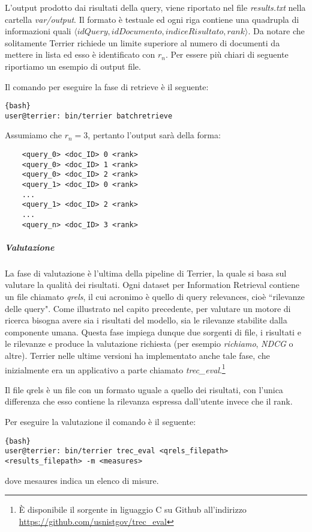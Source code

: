 L'output prodotto dai risultati della query, viene riportato
nel file \textit{results.txt} nella cartella \textit{var/output}. Il formato è testuale
ed ogni riga contiene una quadrupla di informazioni quali
$\langle idQuery, idDocumento, indiceRisultato, rank \rangle$.
Da notare che solitamente Terrier richiede un limite superiore
al numero di documenti da mettere in lista ed esso è identificato
con $r_n$. Per essere più chiari di seguente riportiamo un esempio
di output file.

Il comando per eseguire la fase di retrieve è il seguente:
\begin{lstlisting}{bash}
user@terrier: bin/terrier batchretrieve
\end{lstlisting}

\begin{esempio}
	Assumiamo che $r_n=3$, pertanto l'output sarà della forma:
	
	\begin{lstlisting}
	<query_0> <doc_ID> 0 <rank>
	<query_0> <doc_ID> 1 <rank>
	<query_0> <doc_ID> 2 <rank>
	<query_1> <doc_ID> 0 <rank>
	...
	<query_1> <doc_ID> 2 <rank>
	...
	<query_n> <doc_ID> 3 <rank>
	\end{lstlisting}
\end{esempio}

\subparagraph{Valutazione} La fase di valutazione
è l'ultima della pipeline di Terrier, la quale si basa sul valutare la qualità dei risultati.
Ogni dataset per Information Retrieval contiene un file chiamato \textit{qrels}, il cui
acronimo è quello di query relevances, cioè ``rilevanze delle query".
Come illustrato nel capito precedente, per valutare un motore di ricerca bisogna
avere sia i risultati del modello, sia le rilevanze stabilite dalla componente umana.
Questa fase impiega dunque due sorgenti di file, i risultati e le rilevanze e produce
la valutazione richiesta (per esempio \textit{richiamo}, \textit{NDCG} o altre).
Terrier nelle ultime versioni ha implementato anche tale fase,
che inizialmente era un applicativo a parte chiamato \textit{trec\_eval}.\footnote{\`E disponibile il sorgente in liguaggio C su Github all'indirizzo \href{https://github.com/usnistgov/trec_eval}{https://github.com/usnistgov/trec\_eval}}

Il file qrels è un file con un formato uguale a quello dei risultati,
con l'unica differenza che esso contiene la rilevanza espressa dall'utente invece che il rank.

Per eseguire la valutazione il comando è il seguente:
\begin{lstlisting}{bash}
user@terrier: bin/terrier trec_eval <qrels_filepath> <results_filepath> -m <measures>
\end{lstlisting}

dove mesaures indica un elenco di misure.